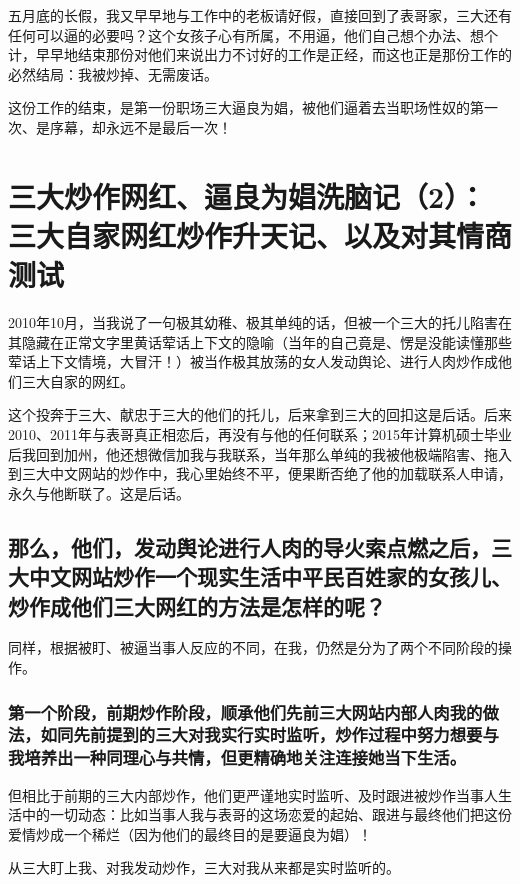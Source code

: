 \documentclass[9pt, b5paper]{article}
\begin{document}
五月底的长假，我又早早地与工作中的老板请好假，直接回到了表哥家，三大还有任何可以逼的必要吗？这个女孩子心有所属，不用逼，他们自己想个办法、想个计，早早地结束那份对他们来说出力不讨好的工作是正经，而这也正是那份工作的必然结局：我被炒掉、无需废话。 

这份工作的结束，是第一份职场三大逼良为娼，被他们逼着去当职场性奴的第一次、是序幕，却永远不是最后一次！

\section{三大炒作网红、逼良为娼洗脑记（2）：三大自家网红炒作升天记、以及对其情商测试}
\label{sec:org33e881e}

2010年10月，当我说了一句极其幼稚、极其单纯的话，但被一个三大的托儿陷害在其隐藏在正常文字里黄话荤话上下文的隐喻（当年的自己竟是、愣是没能读懂那些荤话上下文情境，大冒汗！）被当作极其放荡的女人发动舆论、进行人肉炒作成他们三大自家的网红。

这个投奔于三大、献忠于三大的他们的托儿，后来拿到三大的回扣这是后话。后来2010、2011年与表哥真正相恋后，再没有与他的任何联系；2015年计算机硕士毕业后我回到加州，他还想微信加我与我联系，当年那么单纯的我被他极端陷害、拖入到三大中文网站的炒作中，我心里始终不平，便果断否绝了他的加载联系人申请，永久与他断联了。这是后话。 

\subsection{那么，他们，发动舆论进行人肉的导火索点燃之后，三大中文网站炒作一个现实生活中平民百姓家的女孩儿、炒作成他们三大网红的方法是怎样的呢？}
\label{sec:orgb5d64aa}

同样，根据被盯、被逼当事人反应的不同，在我，仍然是分为了两个不同阶段的操作。

\subsubsection{第一个阶段，前期炒作阶段，顺承他们先前三大网站内部人肉我的做法，如同先前提到的三大对我实行实时监听，炒作过程中努力想要与我培养出一种同理心与共情，但更精确地关注连接她当下生活。}
\label{sec:orgb4ac810}

但相比于前期的三大内部炒作，他们更严谨地实时监听、及时跟进被炒作当事人生活中的一切动态：比如当事人我与表哥的这场恋爱的起始、跟进与最终他们把这份爱情炒成一个稀烂（因为他们的最终目的是要逼良为娼）！

从三大盯上我、对我发动炒作，三大对我从来都是实时监听的。
\end{document}

